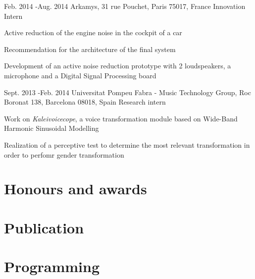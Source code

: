 \documentclass[10pt]{article} %
\begin{document}
\job
{Feb. 2014 -}{Aug. 2014}
{Arkamys, 31 rue Pouchet, Paris 75017, France }
{}
{Innovation Intern}
{
Active reduction of the engine noise in the cockpit of a car 
\begin{itemize-noindent}
\item{Recommendation for the architecture of the final system}
\item{Development of an active noise reduction prototype with 2 loudspeakers, a microphone and a Digital Signal Processing board}
\end{itemize-noindent}
}


\job
{Sept. 2013 -}{Feb. 2014}
{Universitat Pompeu Fabra - Music Technology Group, Roc Boronat 138, Barcelona 08018, Spain}
{}
{Research intern}
{Work on \textit{Kaleivoicecope}, a voice transformation module based on Wide-Band Harmonic Sinusoidal Modelling
\begin{itemize-noindent}
\item{Realization of a perceptive test to determine the most relevant transformation in order to perfomr gender transformation}
\end{itemize-noindent}
}

\section{Honours and awards}

\section{Publication}


\section{Programming}
\end{document}
